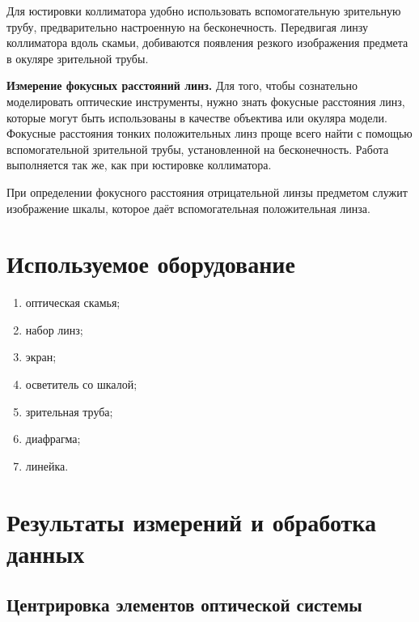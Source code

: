 \documentclass[a4paper, 12pt]{article}
\begin{document}
Для юстировки коллиматора удобно использовать вспомогательную зрительную трубу, предварительно настроенную на бесконечность. Передвигая
	линзу коллиматора вдоль скамьи, добиваются появления резкого изображения предмета в окуляре зрительной трубы.
	
\textbf{Измерение фокусных расстояний линз.} Для того, чтобы сознательно
	моделировать оптические инструменты, нужно знать фокусные расстояния
	линз, которые могут быть использованы в качестве объектива или окуляра модели. Фокусные расстояния тонких положительных линз проще всего
	найти с помощью вспомогательной зрительной трубы, установленной на бесконечность. Работа выполняется так же, как при юстировке коллиматора.
	
При определении фокусного расстояния отрицательной линзы предметом
	служит изображение шкалы, которое даёт вспомогательная положительная
	линза.
  	
\section{Используемое оборудование}

\begin{enumerate}
    \item оптическая скамья;
    \item набор линз;
    \item экран;
    \item осветитель со шкалой;
    \item зрительная труба;
    \item диафрагма;
    \item линейка.
\end{enumerate}

\section{Результаты измерений и обработка данных}


\subsection{Центрировка элементов оптической системы}
\end{document}
